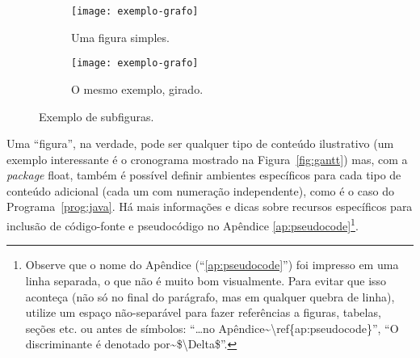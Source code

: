 \begin{figure}
  \centering

  \begin{subfigure}{0.4\textwidth}
    \centering
    \texttt{[image: exemplo-grafo]}
    \caption{Uma figura simples.\label{fig:subfigures:a}}
  \end{subfigure}
  \begin{subfigure}{0.4\textwidth}
    \centering
    \begin{turn}{90} %
      \texttt{[image: exemplo-grafo]}
    \end{turn}
    \caption{O mesmo exemplo, girado.\label{fig:subfigures:b}}
  \end{subfigure}

  \caption{Exemplo de subfiguras.\label{fig:subfigures}}
\end{figure}

Uma ``figura'', na verdade, pode ser qualquer tipo de conteúdo ilustrativo
(um exemplo interessante é o cronograma mostrado na Figura~\ref{fig:gantt})
mas, com a \textit{package} \textsf{float}, também é possível definir ambientes
específicos para cada tipo de conteúdo adicional (cada um com numeração
independente), como é o caso do Programa~\ref{prog:java}. Há
mais informações e dicas sobre recursos específicos para inclusão de
código-fonte e pseudocódigo no Apêndice \ref{ap:pseudocode}\footnote{
Observe que o nome do Apêndice (``\ref{ap:pseudocode}'') foi impresso em
uma linha separada, o que não é muito bom visualmente. Para evitar que isso
aconteça (não só no final do parágrafo, mas em qualquer quebra de linha),
utilize um espaço não-separável para fazer referências a figuras, tabelas,
seções etc. ou antes de símbolos: ``\textsf{\dots no
Apêndice\textasciitilde\textbackslash{}ref\{ap:pseudocode\}}'',
``\textsf{O discriminante é denotado
por\textasciitilde{}\$\textbackslash{}Delta\$}''.}.



